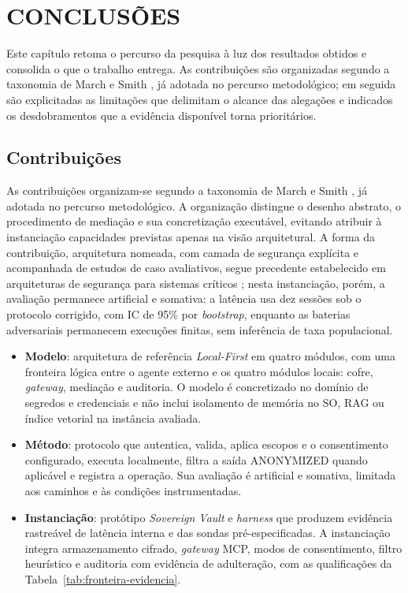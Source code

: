 \chapter{CONCLUSÕES}
Este capítulo retoma o percurso da pesquisa à luz dos resultados obtidos e consolida o que o trabalho entrega. As contribuições são organizadas segundo a taxonomia de March e Smith \cite{march1995}, já adotada no percurso metodológico; em seguida são explicitadas as limitações que delimitam o alcance das alegações e indicados os desdobramentos que a evidência disponível torna prioritários.

\section{Contribuições}
As contribuições organizam-se segundo a taxonomia de March e Smith \cite{march1995}, já adotada no percurso metodológico. A organização distingue o desenho abstrato, o procedimento de mediação e sua concretização executável, evitando atribuir à instanciação capacidades previstas apenas na visão arquitetural. A forma da contribuição, arquitetura nomeada, com camada de segurança explícita e acompanhada de estudos de caso avaliativos, segue precedente estabelecido em arquiteturas de segurança para sistemas críticos \cite{pigatto2016}; nesta instanciação, porém, a avaliação permanece artificial e somativa: a latência usa dez sessões sob o protocolo corrigido, com IC de 95\% por \textit{bootstrap}, enquanto as baterias adversariais permanecem execuções finitas, sem inferência de taxa populacional.

\begin{itemize}
\item \textbf{Modelo}: arquitetura de referência \textit{Local-First} em quatro módulos, com uma fronteira lógica entre o agente externo e os quatro módulos locais: cofre, \textit{gateway}, mediação e auditoria. O modelo é concretizado no domínio de segredos e credenciais e não inclui isolamento de memória no SO, RAG ou índice vetorial na instância avaliada.
\item \textbf{Método}: protocolo que autentica, valida, aplica escopos e o consentimento configurado, executa localmente, filtra a saída ANONYMIZED quando aplicável e registra a operação. Sua avaliação é artificial e somativa, limitada aos caminhos e às condições instrumentadas.
\item \textbf{Instanciação}: protótipo \textit{Sovereign Vault} e \textit{harness} que produzem evidência rastreável de latência interna e das sondas pré-especificadas. A instanciação integra armazenamento cifrado, \textit{gateway} MCP, modos de consentimento, filtro heurístico e auditoria com evidência de adulteração, com as qualificações da Tabela~\ref{tab:fronteira-evidencia}.
\end{itemize}


